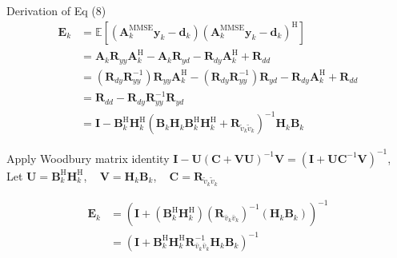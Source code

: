 \documentclass[aspectratio=169, 10pt]{beamer}
\begin{document}
\begin{frame}[label=app-mmse_rx_filter_8]{Derivation of Eq (8)}
    \vspace{-2ex}
    \begin{align*}
        \mathbf{E}_k
         & = \mathbb{E}\left[\left(\mathbf{A}_k^{\mathrm{MMSE}} \mathbf{y}_k-\mathbf{d}_k\right)\left(\mathbf{A}_k^{\mathrm{MMSE}} \mathbf{y}_k-\mathbf{d}_k\right)^{\mathrm{H}}\right]                                             \\
         & = \mathbf{A}_k \mathbf{R}_{yy} \mathbf{A}_k^\mathrm{H}-\mathbf{A}_k\mathbf{R}_{yd} -\mathbf{R}_{dy}\mathbf{A}_k^\mathrm{H}+\mathbf{R}_{dd}                                                                               \\
         & = (\mathbf{R}_{dy}\mathbf{R}_{yy}^{-1}) \mathbf{R}_{yy} \mathbf{A}_k^\mathrm{H}-(\mathbf{R}_{dy}\mathbf{R}_{yy}^{-1})\mathbf{R}_{yd} -\mathbf{R}_{dy}\mathbf{A}_k^\mathrm{H} +\mathbf{R}_{dd}                            \\
         & = \mathbf{R}_{dd}-\mathbf{R}_{dy}\mathbf{R}_{yy}^{-1}\mathbf{R}_{yd}                                                                                                                                                     \\
         & = \mathbf{I} - \mathbf{B}_k^\mathrm{H} \mathbf{H}_k^\mathrm{H}\left(\mathbf{B}_k \mathbf{H}_k \mathbf{B}_k^\mathrm{H} \mathbf{H}_k^\mathrm{H} + \mathbf{R}_{\tilde{v}_k\tilde{v}_k}\right)^{-1}\mathbf{H}_k \mathbf{B}_k
    \end{align*}

    Apply Woodbury matrix identity $\mathbf{I}-\mathbf{U}(\mathbf{C}+\mathbf{V} \mathbf{U})^{-1} \mathbf{V}=\left(\mathbf{I}+\mathbf{U C}^{-1} \mathbf{V}\right)^{-1}$, \\
    Let $\mathbf{U} = \mathbf{B}_k^\mathrm{H} \mathbf{H}_k^\mathrm{H}$, $\;\;\;\mathbf{V} = \mathbf{H}_k \mathbf{B}_k$, $\;\;\;\mathbf{C} = \mathbf{R}_{\tilde{v}_k \tilde{v}_k}$

    \begin{align*}
        \mathbf{E}_k & =\left(\mathbf{I}+\left(\mathbf{B}_k^\mathrm{H} \mathbf{H}_k^\mathrm{H} \right)\left(\mathbf{R}_{\bar{v}_k \bar{v}_k}\right)^{-1}\left(\mathbf{H}_k \mathbf{B}_k\right)\right)^{-1} \\
                     & =\left(\mathbf{I}+\mathbf{B}_k^\mathrm{H} \mathbf{H}_k^\mathrm{H}  \mathbf{R}_{\bar{v}_k \bar{v}_k}^{-1} \mathbf{H}_k \mathbf{B}_k\right)^{-1}
    \end{align*}

    \begin{flushright}
        \hyperlink{main-mmse_rx_filter}{}
    \end{flushright}
    \vspace{-3ex}
\end{frame}
\end{document}
